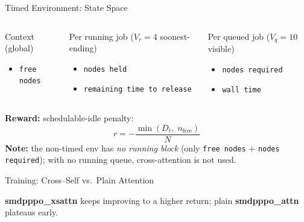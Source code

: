 \begin{frame}{Timed Environment: State Space}
  \begin{columns}[T,onlytextwidth]
      \begin{block}{Context (global)}
        \footnotesize
        \begin{itemize}\setlength\itemsep{2pt}
          \item \texttt{free nodes}
        \end{itemize}
      \end{block}
      \begin{block}{Per running job \;(\textcolor{SoftCoral}{$V_r=4$} soonest-ending)}
        \footnotesize
        \begin{itemize}\setlength\itemsep{2pt}
          \item \texttt{nodes held}
          \item \texttt{remaining time to release}
        \end{itemize}
      \end{block}
      \begin{block}{Per queued job \;(\textcolor{SoftCoral}{$V_q=10$} visible)}
        \footnotesize
        \begin{itemize}\setlength\itemsep{2pt}
          \item \texttt{nodes required}
          \item \texttt{wall time}
        \end{itemize}
      \end{block}
      \vspace{0.5em}
  \end{columns}
\vspace{1.6em}
    {\small\textcolor{DeepBlue}{{\textbf{Reward:} schedulable-idle penalty:}\\ $$r=-\dfrac{\min(D_t,\;n_{\text{free}})}{N}$$}}
  {\footnotesize\textcolor{SoftCoral}{\textbf{Note:} the non-timed env has \emph{no running block} (only \texttt{free nodes} + \texttt{nodes required}); with no running queue, cross-attention is not used.}}
\end{frame}

\begin{frame}{Training: Cross--Self vs.\ Plain Attention}
  \centering

  \vspace{0.2em}
  {\small\textcolor{DeepBlue}{\textbf{smdpppo\_xsattn} keeps improving to a higher return; plain \textbf{smdpppo\_attn} plateaus early.}}
\end{frame}

